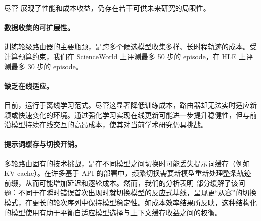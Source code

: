 尽管 \method 展现了性能和成本收益，仍存在若干可供未来研究的局限性。

\paragraph{数据收集的可扩展性。}训练轮级路由器的主要瓶颈，是跨多个候选模型收集多样、长时程轨迹的成本。受计算预算约束，我们在 ScienceWorld 上评测最多 50 步的 episode，在 HLE 上评测最多 30 步的 episode。

\paragraph{缺乏在线适应。}目前，\method 运行于离线学习范式。尽管这显著降低训练成本，路由器却无法实时适应新颖或快速变化的环境。通过强化学习实现在线更新可能进一步提升稳健性，但与前沿模型持续在线交互的高昂成本，使其对当前学术研究仍具挑战。

\paragraph{提示词缓存与切换开销。}多轮路由固有的技术挑战，是在不同模型之间切换时可能丢失提示词缓存（例如 KV cache）。在许多基于 API 的部署中，频繁切换需要新模型重新处理整条轨迹前缀，从而可能增加延迟和逐轮成本。然而，我们的分析表明 \method 部分缓解了该问题：不同于在瞬时错误首次出现时就切换模型的反应式基线，\method 呈现更“从容”的切换模式，在更长的轮次序列中保持模型稳定性。如成本效率结果所反映，这种结构化的模型使用有助于平衡自适应模型选择与上下文缓存收益之间的权衡。
